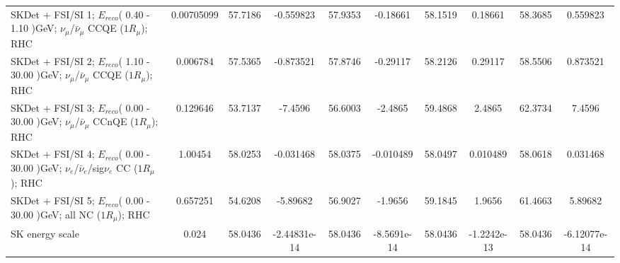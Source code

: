 \begin{tabular}{| l | S | S  S | S  S | S  S | S  S | }
SKDet + FSI/SI  1; $E_{reco}$( 0.40 - 1.10 )GeV; $\nu_{\mu}$/$\bar{\nu}_{\mu}$ CCQE ($1R_{\mu}$); RHC &      0.00705099 &         57.7186 &       -0.559823 &         57.9353 &        -0.18661 &         58.1519 &         0.18661 &         58.3685 &        0.559823 \\ 
SKDet + FSI/SI  2; $E_{reco}$( 1.10 - 30.00 )GeV; $\nu_{\mu}$/$\bar{\nu}_{\mu}$ CCQE ($1R_{\mu}$); RHC &        0.006784 &         57.5365 &       -0.873521 &         57.8746 &        -0.29117 &         58.2126 &         0.29117 &         58.5506 &        0.873521 \\ 
SKDet + FSI/SI  3; $E_{reco}$( 0.00 - 30.00 )GeV; $\nu_{\mu}$/$\bar{\nu}_{\mu}$ CCnQE ($1R_{\mu}$); RHC &        0.129646 &         53.7137 &         -7.4596 &         56.6003 &         -2.4865 &         59.4868 &          2.4865 &         62.3734 &          7.4596 \\ 
SKDet + FSI/SI  4; $E_{reco}$( 0.00 - 30.00 )GeV; $\nu_{e}$/$\bar{\nu}_{e}$/sig$\nu_{e}$ CC ($1R_{\mu}$); RHC &         1.00454 &         58.0253 &       -0.031468 &         58.0375 &       -0.010489 &         58.0497 &        0.010489 &         58.0618 &        0.031468 \\ 
      SKDet + FSI/SI  5; $E_{reco}$( 0.00 - 30.00 )GeV; all NC ($1R_{\mu}$); RHC &        0.657251 &         54.6208 &        -5.89682 &         56.9027 &         -1.9656 &         59.1845 &          1.9656 &         61.4663 &         5.89682 \\ 
                                                                 SK energy scale &           0.024 &         58.0436 &    -2.44831e-14 &         58.0436 &     -8.5691e-14 &         58.0436 &     -1.2242e-13 &         58.0436 &    -6.12077e-14 \\ 
\bottomrule
\end{tabular}
